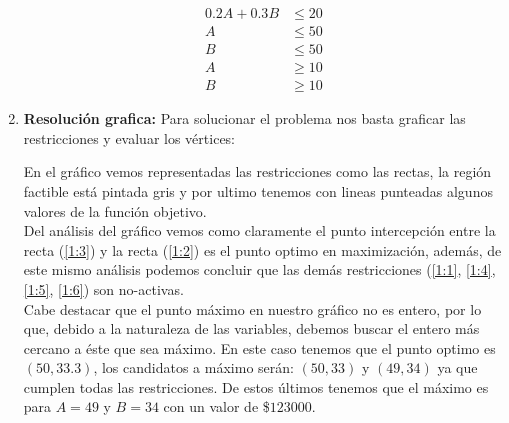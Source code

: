 \documentclass[spanish, fleqn]{article}
\begin{document}
\begin{enumerate}
\begin{align}
					0.2A + 0.3B &\leq 20 \label{1:2}\\
							  A &\leq 50 \label{1:3}\\
							  B &\leq 50 \label{1:4}\\
							  A &\geq 10 \label{1:5}\\
							  B &\geq 10 \label{1:6}
			\end{align}
			\newpage
		\item
			\textbf{Resolución grafica:} Para solucionar el problema nos basta
			graficar las restricciones y evaluar los vértices:
			
			En el gráfico vemos representadas las restricciones como las rectas,
			la región factible está pintada gris y por ultimo tenemos con lineas
			punteadas algunos valores de la función objetivo.\\
			Del análisis del gráfico vemos como claramente el punto intercepción
			entre la recta (\ref{1:3}) y la recta (\ref{1:2}) es el punto optimo
			en maximización, además, de este mismo análisis podemos concluir que 
			las demás restricciones (\ref{1:1}, \ref{1:4}, \ref{1:5}, \ref{1:6})
			son no-activas.\\
			Cabe destacar que el punto máximo en nuestro gráfico no es entero,
			por lo que, debido a la naturaleza de las variables, debemos buscar
			el entero más cercano a éste que sea máximo. En este caso tenemos
			que el punto optimo es $(50, 33.3)$, los candidatos a máximo serán:
			$(50,33)$ y $(49,34)$ ya que cumplen todas las restricciones. De 
			estos últimos tenemos que el máximo es para $A=49$ y $B=34$ con un
			valor de \$$123000$.
	\end{enumerate}
	\newpage
\end{document}
